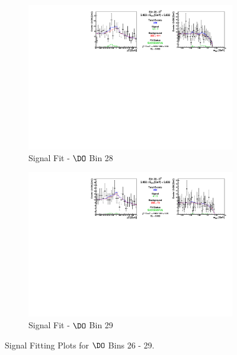 \begin{figure}[h]
\begin{subfigure}[c]{0.99\textwidth}
\includegraphics[width=\textwidth]{figures/plots/fit_results/D0_bin_28.pdf}
\caption*{Signal Fit - $\DO$ Bin 28}
\end{subfigure}

\vspace{5pt}

\begin{subfigure}[c]{0.99\textwidth}
\includegraphics[width=\textwidth]{figures/plots/fit_results/D0_bin_29.pdf}
\caption*{Signal Fit - $\DO$ Bin 29}
\end{subfigure}

\caption{Signal Fitting Plots for $\DO$ Bins 26 - 29.}
\label{fig:DO_plots_26_29}

\end{figure}


